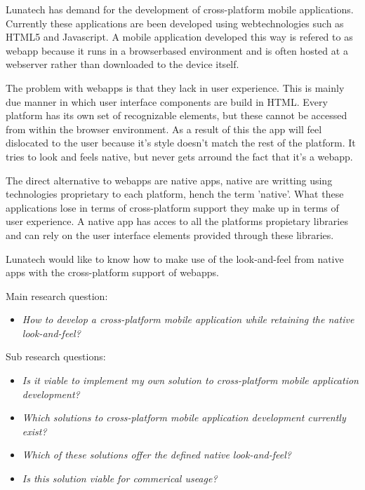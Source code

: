 

Lunatech has demand for the development of cross-platform mobile applications. Currently these applications are been developed using webtechnologies such as HTML5 and Javascript. A mobile application developed this way is refered to as webapp because it runs in a browserbased environment and is often hosted at a webserver rather than downloaded to the device itself.

The problem with webapps is that they lack in user experience. This is mainly due manner in which user interface components are build in HTML. Every platform has its own set of recognizable elements, but these cannot be accessed from within the browser environment. As a result of this the app will feel dislocated to the user because it's style doesn't match the rest of the platform. It tries to look and feels native, but never gets arround the fact that it's a webapp.

The direct alternative to webapps are native apps, native are writting using technologies proprietary to each platform, hench the term 'native'. What these applications lose in terms of cross-platform support they make up in terms of user experience.  A native app has acces to all the platforms propietary libraries and can rely on the user interface elements provided through these libraries.

Lunatech would like to know how to make use of the look-and-feel from native apps with the cross-platform support of webapps.


Main research question:
\begin{itemize}
\item \emph{How to develop a cross-platform mobile application while retaining the native look-and-feel?}
\end{itemize}

\noindent Sub research questions:
\begin{itemize}
\item \emph{Is it viable to implement my own solution to cross-platform mobile application development?}
\item \emph{Which solutions to cross-platform mobile application development currently exist?}
\item \emph{Which of these solutions offer the defined native look-and-feel?}
\item \emph{Is this solution viable for commerical useage?}
\end{itemize}

